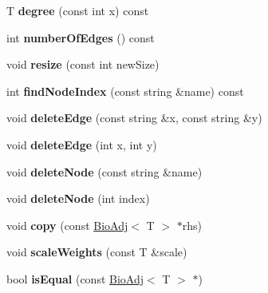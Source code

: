 \begin{DoxyCompactItemize}
T {\bfseries degree} (const int x) const
\item 
\mbox{\label{class_bio_adj_list_a2f70bb3a138c17bb8bb7cf02e6dd12f4}} 
int {\bfseries number\+Of\+Edges} () const
\item 
\mbox{\label{class_bio_adj_list_ac55fcd3f183f786e8352f1f81cfb0056}} 
void {\bfseries resize} (const int new\+Size)
\item 
\mbox{\label{class_bio_adj_list_a37b6c5c788259af6307a59ba0badb985}} 
int {\bfseries find\+Node\+Index} (const string \&name) const
\item 
\mbox{\label{class_bio_adj_list_a55eb65879271ca6722ba19af93a4fd8c}} 
void {\bfseries delete\+Edge} (const string \&x, const string \&y)
\item 
\mbox{\label{class_bio_adj_list_aa2b060c216162352ac58ec2eddead199}} 
void {\bfseries delete\+Edge} (int x, int y)
\item 
\mbox{\label{class_bio_adj_list_a9e2bc76c559cf676565e930b3f57433a}} 
void {\bfseries delete\+Node} (const string \&name)
\item 
\mbox{\label{class_bio_adj_list_a1d22ffb38372caa9922e458f0c587c63}} 
void {\bfseries delete\+Node} (int index)
\item 
\mbox{\label{class_bio_adj_list_a5a0d3d456727ffc1728ef6ef1f3356bd}} 
void {\bfseries copy} (const \hyperlink{class_bio_adj}{Bio\+Adj}$<$ T $>$ $\ast$rhs)
\item 
\mbox{\label{class_bio_adj_list_ac0508b6a85df7fb7965b7e80e1b6a36a}} 
void {\bfseries scale\+Weights} (const T \&scale)
\item 
\mbox{\label{class_bio_adj_list_a3d421395b70321f8ec36ef3ecff565f0}} 
bool {\bfseries is\+Equal} (const \hyperlink{class_bio_adj}{Bio\+Adj}$<$ T $>$ $\ast$)
\item 
\mbox{\label{class_bio_adj_list_ab2e303f2a71183bacf22fbe615642cc6}} 

\end{DoxyCompactItemize}
